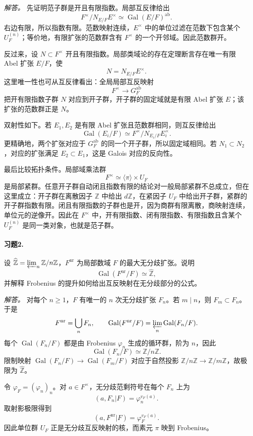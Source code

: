 \documentclass[11pt,a4paper,openany]{ctexbook}
\numberwithin{equation}{chapter}
\newcommand{\Z}{\mathbb{Z}}
\newcommand{\Gal}{\operatorname{Gal}}
\theoremstyle{plain}
\theoremstyle{definition}
\theoremstyle{remark}
\begin{document}
\emph{解答。}
先证明范子群是开且有限指数。局部互反律给出
\[
F^\times/N_{E/F}E^\times\simeq \Gal(E/F)^{\operatorname{ab}}.
\]
右边有限，所以指数有限。范数映射连续，$E^\times$ 中的单位过滤在范数下包含某个 $U_F^{(n)}$；等价地，有限扩张的范数群含有 $F^\times$ 的一个开邻域。因此范数群开。

反过来，设 $N\subset F^\times$ 开且有限指数。局部类域论的存在定理断言存在唯一有限 Abel 扩张 $E/F$，使
\[
N=N_{E/F}E^\times.
\]
这里唯一性也可从互反律看出：全局局部互反映射
\[
F^\times\to G_F^{\operatorname{ab}}
\]
把开有限指数子群 $N$ 对应到开子群，开子群的固定域就是有限 Abel 扩张 $E$；该扩张的范数群正是 $N$。

双射性如下。若 $E_1,E_2$ 是有限 Abel 扩张且范数群相同，则互反律给出
\[
\Gal(E_i/F)\simeq F^\times/N_{E_i/F}E_i^\times.
\]
更精确地，两个扩张对应于 $G_F^{\operatorname{ab}}$ 的同一个开子群，所以固定域相同。若 $N_1\subset N_2$，对应的扩张满足 $E_2\subset E_1$，这是 Galois 对应的反向性。

最后比较拓扑条件。局部域乘法群
\[
F^\times\simeq \langle\pi\rangle\times U_F
\]
是局部紧群。任意开子群自动闭且指数有限的结论对一般局部紧群不总成立，但在这里成立：开子群在离散因子 $\Z$ 中给出 $d\Z$，在紧因子 $U_F$ 中给出开子群，紧群的开子群指数有限。闭且有限指数的子群也是开，因为商群有限离散，商映射连续，单位元的逆像开。因此在 $F^\times$ 中，开有限指数、闭有限指数、有限指数且含某个 $U_F^{(n)}$ 是同一类对象，也就是范子群。

\paragraph{习题2.}
设 $\widehat{\Z}=\varprojlim_n\Z/n\Z$，$F^{\mathrm{nr}}$ 为局部数域 $F$ 的最大无分歧扩张。说明
\[
\Gal(F^{\mathrm{nr}}/F)\simeq\widehat{\Z},
\]
并解释 Frobenius 的提升如何给出互反映射在无分歧部分的公式。

\emph{解答。}
对每个 $n\ge1$，$F$ 有唯一的 $n$ 次无分歧扩张 $F_n$。若 $m\mid n$，则 $F_m\subset F_n$。于是
\[
F^{\mathrm{nr}}=\bigcup_n F_n,\qquad
\Gal(F^{\mathrm{nr}}/F)=\varprojlim_n\Gal(F_n/F).
\]
每个 $\Gal(F_n/F)$ 都是由 Frobenius $\varphi_n$ 生成的循环群，阶为 $n$，因此
\[
\Gal(F_n/F)\simeq\Z/n\Z.
\]
限制映射 $\Gal(F_n/F)\to\Gal(F_m/F)$ 对应于自然投影 $\Z/n\Z\to\Z/m\Z$，故极限为 $\widehat{\Z}$。

令 $\varphi_F=(\varphi_n)_n$。对 $a\in F^\times$，无分歧范剩符号在每个 $F_n$ 上为
\[
(a,F_n|F)=\varphi_n^{v_F(a)}.
\]
取射影极限得到
\[
(a,F^{\mathrm{nr}}|F)=\varphi_F^{v_F(a)}.
\]
因此单位群 $U_F$ 正是无分歧互反映射的核，而素元 $\pi$ 映到 Frobenius。
\end{document}
